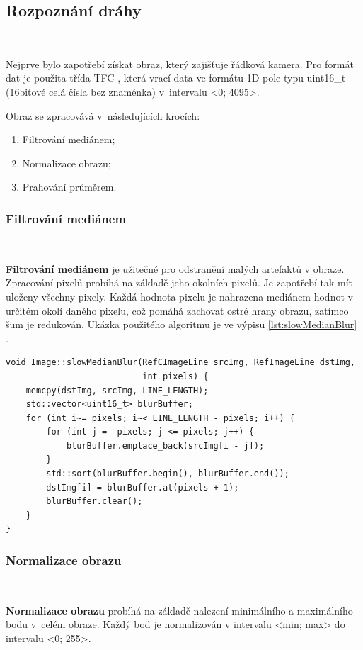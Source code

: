 \subsection{Rozpoznání dráhy}\

Nejprve bylo zapotřebí získat obraz, který zajišťuje řádková kamera. Pro formát dat
je použita třída TFC \cite{draha}, která vrací data ve formátu 1D pole typu 
uint16\_t (16bitové celá čísla bez znaménka) v~intervalu <0; 4095>.

Obraz se zpracovává v~následujících krocích:
\begin{enumerate}
    \item Filtrování mediánem;
    \item Normalizace obrazu;
    \item Prahování průměrem.
\end{enumerate}

\subsubsection*{Filtrování mediánem}\

\textbf{Filtrování mediánem} je užitečné pro odstranění malých artefaktů v obraze.
Zpracování pixelů probíhá na základě jeho okolních pixelů. Je zapotřebí tak mít
uloženy všechny pixely. Každá hodnota pixelu je nahrazena mediánem hodnot v určitém
okolí daného pixelu, což pomáhá zachovat ostré hrany obrazu, zatímco šum je
redukován. Ukázka použitého algoritmu je ve výpisu \ref{lst:slowMedianBlur} 
\cite{draha}\cite{robot}.

\begin{lstlisting}[caption = Filtrování mediánem, label = lst:slowMedianBlur]
void Image::slowMedianBlur(RefCImageLine srcImg, RefImageLine dstImg,
                           int pixels) {
    memcpy(dstImg, srcImg, LINE_LENGTH);
    std::vector<uint16_t> blurBuffer;
    for (int i~= pixels; i~< LINE_LENGTH - pixels; i++) {
        for (int j = -pixels; j <= pixels; j++) {
            blurBuffer.emplace_back(srcImg[i - j]);
        }
        std::sort(blurBuffer.begin(), blurBuffer.end());
        dstImg[i] = blurBuffer.at(pixels + 1);
        blurBuffer.clear();
    }
}
\end{lstlisting}

\subsubsection*{Normalizace obrazu}\

\textbf{Normalizace obrazu} probíhá na základě nalezení minimálního a maximálního
bodu v~celém obraze. Každý bod je normalizován v intervalu <min; max> do intervalu
<0; 255>.

